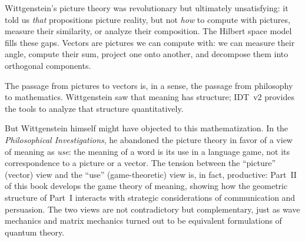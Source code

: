 \begin{interpretation}
\label{interp:wittgenstein}
Wittgenstein's picture theory was revolutionary but ultimately unsatisfying:
it told us \emph{that} propositions picture reality, but not \emph{how} to
compute with pictures, measure their similarity, or analyze their composition.
The Hilbert space model fills these gaps. Vectors are pictures we can compute
with: we can measure their angle, compute their sum, project one onto another,
and decompose them into orthogonal components.

The passage from pictures to vectors is, in a sense, the passage from
philosophy to mathematics. Wittgenstein saw that meaning has structure;
IDT~v2 provides the tools to analyze that structure quantitatively.

But Wittgenstein himself might have objected to this mathematization. In the
\emph{Philosophical Investigations}, he abandoned the picture theory in favor
of a view of meaning as \emph{use}: the meaning of a word is its use in a
language game, not its correspondence to a picture or a vector. The tension
between the ``picture'' (vector) view and the ``use'' (game-theoretic) view
is, in fact, productive: Part~II of this book develops the game theory of
meaning, showing how the geometric structure of Part~I interacts with
strategic considerations of communication and persuasion. The two views are
not contradictory but complementary, just as wave mechanics and matrix
mechanics turned out to be equivalent formulations of quantum theory.
\end{interpretation}

